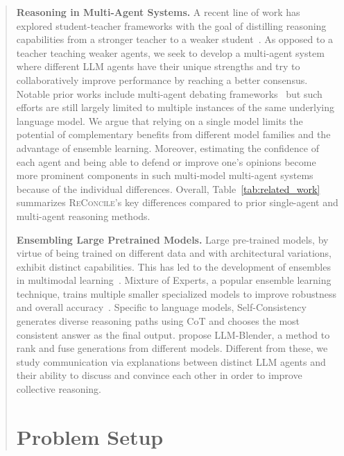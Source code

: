 \documentclass[11pt]{article}
\newcommand{\method}[0]{\textsc{ReConcile}}
\begin{document}
\begin{abstract}
\noindent \textbf{Reasoning in Multi-Agent Systems.}
A recent line of work has explored student-teacher frameworks with the goal of distilling reasoning capabilities from a stronger teacher to a weaker student~\citep{magister2022teaching, fu2023specializing, ho2022large, saha2023can, mukherjee2023orca}. As opposed to a teacher teaching weaker agents, we seek to develop a multi-agent system where different LLM agents have their unique strengths and try to collaboratively improve performance by reaching a better consensus. Notable prior works include multi-agent debating frameworks~\citep{du2023improving, liang2023encouraging, chan2023chateval, xiong2023examining, khan2024debating} but such efforts are still largely limited to multiple instances of the same underlying language model. We argue that relying on a single model limits the potential of complementary benefits from different model families and the advantage of ensemble learning. 
Moreover, estimating the confidence of each agent and being able to defend or improve one's opinions become more prominent components in such multi-model multi-agent systems because of the individual differences. Overall, Table~\ref{tab:related_work} summarizes \method{}'s key differences compared to prior single-agent and multi-agent reasoning methods.

\noindent \textbf{Ensembling Large Pretrained Models.}
Large pre-trained models, by virtue of being trained on different data and with architectural variations, exhibit distinct capabilities. This has led to the development of ensembles~\citep{sagi2018ensemble} in multimodal learning~\citep{zeng2022socratic, li2022composing}. Mixture of Experts, a popular ensemble learning technique, trains multiple smaller specialized models to improve robustness and overall accuracy~\citep{jacobs1991adaptive, shazeer2017outrageously, du2022glam}. Specific to language models, Self-Consistency~\citep{wang2022self} generates diverse reasoning paths using CoT and chooses the most consistent answer as the final output. 
\citet{jiang-etal-2023-llm} propose LLM-Blender, a method to rank and fuse generations from different models. Different from these, we study communication via explanations between distinct LLM agents and their ability to discuss and convince each other in order to improve collective reasoning.
\section{Problem Setup}


\end{abstract}
\end{document}
